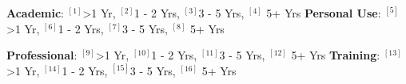 \begin{cventries}
  \cventry
    {} %
    {} 
    {} 
    {} 
    {
      \begin{cvitems} %
        \item[]{\textbf{Academic}: \label{1}{$^{[1]}$>1 Yr}, \label{2}{$^{[2]}$1 - 2 Yrs}, \label{3}{$^{[3]}$3 - 5 Yrs}, \label{4}{$^{[4]}$ 5+ Yrs}%
		\hspace{1.4cm}
		\textbf{Personal Use}: \label{5}{$^{[5]}$>1 Yr}, \label{6}{$^{[6]}$1 - 2 Yrs}, \label{7}{$^{[7]}$3 - 5 Yrs}, \label{8}{$^{[8]}$ 5+ Yrs}}
		\item[]{\textbf{Professional}: \label{9}{$^{[9]}$>1 Yr}, \label{10}{$^{[10]}$1 - 2 Yrs}, \label{11}{$^{[11]}$3 - 5 Yrs}, \label{12}{$^{[12]}$ 5+ Yrs}%
		\hspace{0.5cm}
		\textbf{Training}: \label{13}{$^{[13]}$>1 Yr}, \label{14}{$^{[14]}$1 - 2 Yrs}, \label{15}{$^{[15]}$3 - 5 Yrs}, \label{16}{$^{[16]}$ 5+ Yrs}}
      \end{cvitems}
    }  
  \vspace{0.4cm} 
      

\end{cventries}